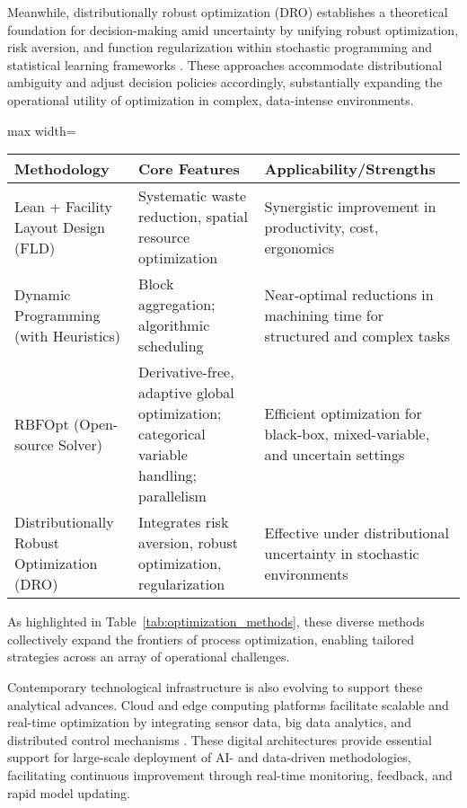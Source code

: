 \documentclass[sigconf]{acmart}
\begin{document}
Meanwhile, distributionally robust optimization (DRO) establishes a theoretical foundation for decision-making amid uncertainty by unifying robust optimization, risk aversion, and function regularization within stochastic programming and statistical learning frameworks \cite{ref76}. These approaches accommodate distributional ambiguity and adjust decision policies accordingly, substantially expanding the operational utility of optimization in complex, data-intense environments.

\begin{table*}[htbp]
  \centering
  \caption{Summary of Selected Optimization Approaches and Their Core Features}
  \label{tab:optimization_methods}
  \begin{adjustbox}{max width=\textwidth}
  \begin{tabular}{lll}
  \toprule
  \textbf{Methodology} & \textbf{Core Features} & \textbf{Applicability/Strengths} \\
  \midrule
  Lean + Facility Layout Design (FLD) & Systematic waste reduction, spatial resource optimization & Synergistic improvement in productivity, cost, ergonomics \\
  Dynamic Programming (with Heuristics) & Block aggregation; algorithmic scheduling & Near-optimal reductions in machining time for structured and complex tasks \\
  RBFOpt (Open-source Solver) & Derivative-free, adaptive global optimization; categorical variable handling; parallelism & Efficient optimization for black-box, mixed-variable, and uncertain settings \\
  Distributionally Robust Optimization (DRO) & Integrates risk aversion, robust optimization, regularization & Effective under distributional uncertainty in stochastic environments \\
  \bottomrule
  \end{tabular}
  \end{adjustbox}
\end{table*}

As highlighted in Table~\ref{tab:optimization_methods}, these diverse methods collectively expand the frontiers of process optimization, enabling tailored strategies across an array of operational challenges.

Contemporary technological infrastructure is also evolving to support these analytical advances. Cloud and edge computing platforms facilitate scalable and real-time optimization by integrating sensor data, big data analytics, and distributed control mechanisms \cite{ref80}. These digital architectures provide essential support for large-scale deployment of AI- and data-driven methodologies, facilitating continuous improvement through real-time monitoring, feedback, and rapid model updating.
\end{document}
